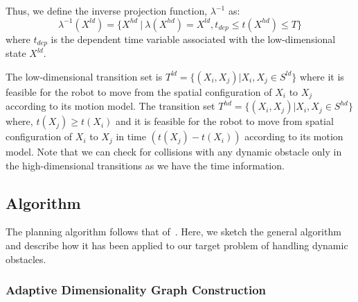 Thus, we define the inverse projection function, $\lambda^{-1}$ as:
$$\lambda^{-1}(X^{ld}) = \{X^{hd} ~|~ \lambda(X^{hd}) = X^{ld}, t_{dep} \leq t(X^{hd}) \leq T\}$$
where $t_{dep}$ is the dependent time variable associated with the low-dimensional state $X^{ld}$.

The low-dimensional transition set is $T^{ld}=\{(X_i,X_j)|X_i,X_j \in S^{ld}\}$ where it is feasible for the robot to move from the spatial configuration of $X_i$ to $X_j$ according to its motion model. %
The transition set $T^{hd} = \{(X_i, X_j)|X_i, X_j \in S^{hd}\}$ where, $t(X_j) \geq t(X_i)$ and it is feasible for the robot to move from spatial configuration of $X_i$ to $X_j$ in time $(t(X_j) - t(X_i))$ according to its motion model. %
Note that we can check for collisions with any dynamic obstacle only in the high-dimensional transitions as we have the time information.  

\subsection{Algorithm}
The planning algorithm follows that of~\cite{gochev2011path}. Here, we sketch the general algorithm and describe how it has been applied to our target problem of handling dynamic obstacles. 

\subsubsection{Adaptive Dimensionality Graph Construction}

